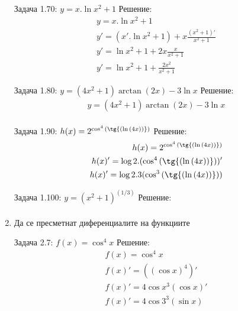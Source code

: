 \documentclass[a4paper, 20pt, fleqn, border=2pt]{article}
\begin{document}
\begin{enumerate}
Задача 1.70: $y = x.\ln{x^2 + 1}$
Решение:
\begin{equation}
\begin{split}
    y = x.\ln{x^2 + 1} \\
    y' = (x'.\ln{x^2 + 1}) + x\frac{(x^2 + 1)'}{x^2 + 1} \\
    y' = \ln{x^2 + 1} + 2x\frac{x}{x^2 + 1} \\
    y' = \ln{x^2 + 1} + \frac{2x^2}{x^2 + 1}
\end{split}
\end{equation}

Задача 1.80: $y = (4x^2 + 1)\arctan(2x) - 3\ln{x}$
Решение:
\begin{equation}
\begin{split}
    y = (4x^2 + 1)\arctan(2x) - 3\ln{x} \\
\end{split}
\end{equation}

Задача 1.90: $h(x) = 2^{\cos^4{(\tg{(\ln{(4x)})})}}$
Решение:
\begin{equation}
\begin{split}
    h(x) = 2^{\cos^4{(\tg{(\ln{(4x)})})}} \\
    h(x)' = \log{2}.(\cos^4{(\tg{(\ln{(4x)})})})' \\
    h(x)' = \log{2}.3(\cos^3{(\tg{(\ln{(4x)})})}) \\
\end{split}
\end{equation}

Задача 1.100: $y = (x^2 + 1)^(1/3)$
Решение:
\begin{equation}
\begin{split}
    \text{}
\end{split}
\end{equation}

    \item Да се пресметнат диференциалите на функциите
\par
\par

Задача 2.7: $f(x) = \cos^4{x}$
Решение:
\begin{equation}
\begin{split}
    f(x) = \cos^4{x} \\
    f(x)' = ((\cos{x})^4)' \\
    f(x)' = 4\cos{x}^3(\cos{x})' \\
    f(x)' = 4\cos{3}^3(\sin{x})
\end{split}
\end{equation}


\end{enumerate}
\end{document}
